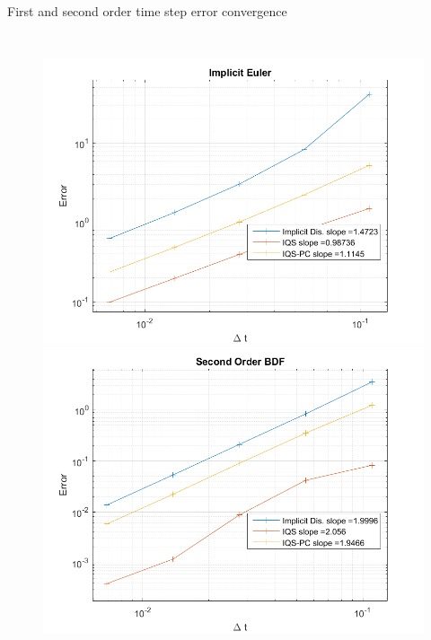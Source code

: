 \documentclass[8pt,xcolor=dvipnames]{beamer}
\begin{document}
\begin{frame}{First and second order time step error convergence}

\begin{columns}
\column{\dimexpr\paperwidth-10pt}
\begin{figure}
\includegraphics[width=0.5\linewidth]{figures/1D_conv_IE.png}
\includegraphics[width=0.5\linewidth]{figures/1D_conv_BDF2.png}
\end{figure}
\end{columns}

\end{frame}
\end{document}

